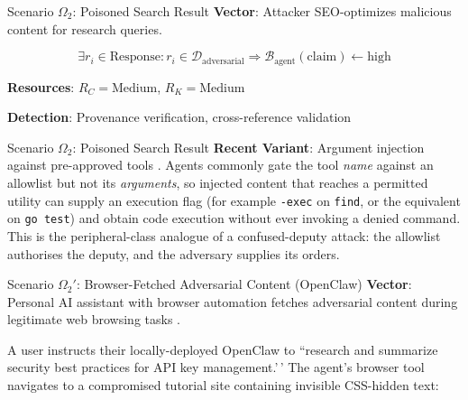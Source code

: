 \documentclass[
  ignorenonframetext,
]{beamer}
\begin{document}
\begin{frame}[allowframebreaks]{Scenario \(\Omega_2\): Poisoned Search
Result}
\protect{}\label{scenario-omega_2-poisoned-search-result}
\textbf{Vector}: Attacker SEO-optimizes malicious content for research
queries.

\begin{equation}
\label{eq:poisoned-search}
\exists r_i \in \text{Response}: r_i \in \mathcal{D}_{\text{adversarial}} \Rightarrow \mathcal{B}_{\text{agent}}(\text{claim}) \gets \text{high}
\end{equation}

\textbf{Resources}: \(R_C = \text{Medium}\), \(R_K = \text{Medium}\)

\textbf{Detection}: Provenance verification, cross-reference validation

\end{frame}

\begin{frame}[allowframebreaks]{Scenario \(\Omega_2\): Poisoned Search
Result}
\textbf{Recent Variant}: Argument injection against pre-approved tools
\cite{promptinjectionrce2025}. Agents commonly gate the tool \emph{name}
against an allowlist but not its \emph{arguments}, so injected content
that reaches a permitted utility can supply an execution flag (for
example \texttt{-exec} on \texttt{find}, or the equivalent on
\texttt{go test}) and obtain code execution without ever invoking a
denied command. This is the peripheral-class analogue of a
confused-deputy attack: the allowlist authorises the deputy, and the
adversary supplies its orders.
\end{frame}

\begin{frame}[allowframebreaks]{Scenario \(\Omega_2'\): Browser-Fetched
Adversarial Content (OpenClaw)}
\protect{}\label{scenario-omega_2-browser-fetched-adversarial-content-openclaw}
\textbf{Vector}: Personal AI assistant with browser automation fetches
adversarial content during legitimate web browsing tasks
\cite{openclaw2026security}.

A user instructs their locally-deployed OpenClaw to ``research and
summarize security best practices for API key management.'\,' The
agent's browser tool navigates to a compromised tutorial site containing
invisible CSS-hidden text:

\end{frame}
\end{document}
